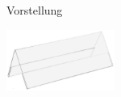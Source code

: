 \documentclass[aspectratio=169,t]{beamer}
\begin{document}
\begin{frame}{Vorstellung}
{\begin{textblock}{15}
   \includegraphics[angle=77,origin=c,height=2cm]{Bilder/Tischnamensschild.png}
  \end{textblock}
 }
\end{frame}
\end{document}
